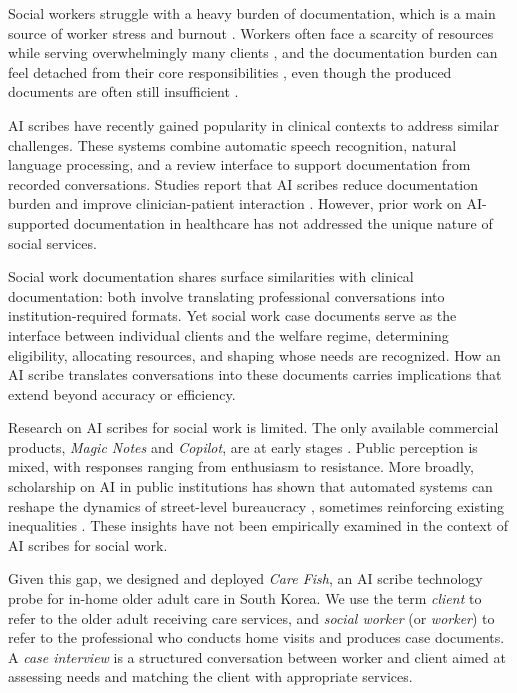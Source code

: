 \documentclass{article}
\begin{document}
Social workers struggle with a heavy burden of documentation, which is a main source of worker stress and burnout \citep{nelson2024designing, gondimalla2024aligning}. Workers often face a scarcity of resources while serving overwhelmingly many clients \citep{lee2020problems}, and the documentation burden can feel detached from their core responsibilities \citep{kim2023seoul, jo2025understanding}, even though the produced documents are often still insufficient \citep{kuorikoski2024client}.

AI scribes have recently gained popularity in clinical contexts to address similar challenges. These systems combine automatic speech recognition, natural language processing, and a review interface to support documentation from recorded conversations. Studies report that AI scribes reduce documentation burden and improve clinician-patient interaction \citep{cao2024, tierney2024, nair2026}. However, prior work on AI-supported documentation in healthcare \citep{sasseville2025impact, lee2024evaluating, li2021automating} has not addressed the unique nature of social services.

Social work documentation shares surface similarities with clinical documentation: both involve translating professional conversations into institution-required formats. Yet social work case documents serve as the interface between individual clients and the welfare regime, determining eligibility, allocating resources, and shaping whose needs are recognized. How an AI scribe translates conversations into these documents carries implications that extend beyond accuracy or efficiency.

Research on AI scribes for social work is limited. The only available commercial products, \textit{Magic Notes} and \textit{Copilot}, are at early stages \citep{meers2026}. Public perception is mixed, with responses ranging from enthusiasm to resistance. More broadly, scholarship on AI in public institutions has shown that automated systems can reshape the dynamics of street-level bureaucracy \citep{alkhatib2019street}, sometimes reinforcing existing inequalities \citep{eubanks2018automating}. These insights have not been empirically examined in the context of AI scribes for social work.

Given this gap, we designed and deployed \textit{Care Fish}, an AI scribe technology probe for in-home older adult care in South Korea. We use the term \textit{client} to refer to the older adult receiving care services, and \textit{social worker} (or \textit{worker}) to refer to the professional who conducts home visits and produces case documents. A \textit{case interview} is a structured conversation between worker and client aimed at assessing needs and matching the client with appropriate services.
\end{document}
